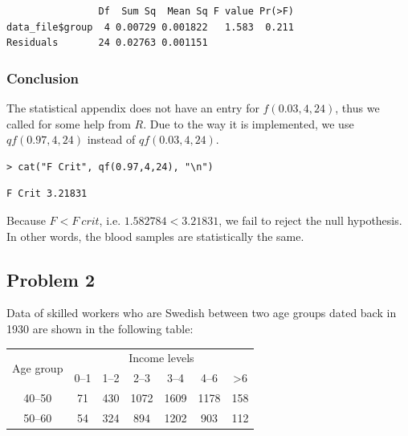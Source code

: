 \documentclass[a4paper]{article}
\numberwithin{equation}{section}
\begin{document}
\begin{mdframed}[leftline=false,rightline=false,backgroundcolor=teal!10,nobreak=true]
  \begin{verbatim}
                Df  Sum Sq  Mean Sq F value Pr(>F)
data_file$group  4 0.00729 0.001822   1.583  0.211
Residuals       24 0.02763 0.001151
  \end{verbatim}
\end{mdframed}

\subsubsection{Conclusion}
The statistical appendix does not have an entry for \(f(0.03, 4, 24)\), thus we called for some help from \(R\).
Due to the way it is implemented, we use \(qf(0.97, 4, 24)\) instead of \(qf(0.03, 4, 24)\).
\begin{mdframed}[leftline=false,rightline=false,backgroundcolor=teal!10,nobreak=true]
  \begin{verbatim}
> cat("F Crit", qf(0.97,4,24), "\n")
  \end{verbatim}
  \begin{verbatim}
F Crit 3.21831
  \end{verbatim}
\end{mdframed}

Because \(F < F\ crit\), i.e. \(1.582784 < 3.21831\), we fail to reject the null hypothesis.
In other words, the blood samples are statistically the same.

\newpage
\subsection{Problem 2}\label{p2}
Data of skilled workers who are Swedish between two age groups dated back in 1930 are shown in the following table:

\begin{center}
  \begin{tabular}{ccccccc}
    \toprule
    \multirow{2}{*}{Age group} & \multicolumn{6}{c}{Income levels}                                   \\
    \cmidrule(lr){2-7}
                               & 0--1                              & 1--2 & 2--3 & 3--4 & 4--6 & >6  \\
    \midrule
    40--50                     & 71                                & 430  & 1072 & 1609 & 1178 & 158 \\
    50--60                     & 54                                & 324  & 894  & 1202 & 903  & 112 \\
    \bottomrule
  \end{tabular}
\end{center}
\end{document}
